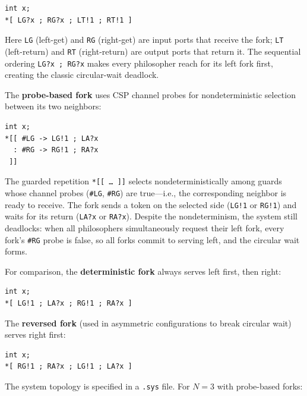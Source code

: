 \documentclass[11pt]{article}
\begin{document}
\begin{lstlisting}[frame=single,xleftmargin=1em,xrightmargin=1em]
int x;
*[ LG?x ; RG?x ; LT!1 ; RT!1 ]
\end{lstlisting}

Here \texttt{LG} (left-get) and \texttt{RG} (right-get) are input
ports that receive the fork; \texttt{LT} (left-return) and \texttt{RT}
(right-return) are output ports that return it.  The sequential
ordering \texttt{LG?x\,;\,RG?x} makes every philosopher reach for its
left fork first, creating the classic circular-wait deadlock.

The \textbf{probe-based fork} uses CSP channel probes for
nondeterministic selection between its two neighbors:

\begin{lstlisting}[frame=single,xleftmargin=1em,xrightmargin=1em]
int x;
*[[ #LG -> LG!1 ; LA?x
  : #RG -> RG!1 ; RA?x
 ]]
\end{lstlisting}

The guarded repetition \texttt{*[[\,\ldots\,]]} selects nondeterministically
among guards whose channel probes (\texttt{\#LG}, \texttt{\#RG}) are
true---i.e., the corresponding neighbor is ready to receive.  The fork
sends a token on the selected side (\texttt{LG!1} or \texttt{RG!1})
and waits for its return (\texttt{LA?x} or \texttt{RA?x}).  Despite
the nondeterminism, the system still deadlocks: when all philosophers
simultaneously request their left fork, every fork's \texttt{\#RG}
probe is false, so all forks commit to serving left, and the circular
wait forms.

For comparison, the \textbf{deterministic fork} always serves left
first, then right:

\begin{lstlisting}[frame=single,xleftmargin=1em,xrightmargin=1em]
int x;
*[ LG!1 ; LA?x ; RG!1 ; RA?x ]
\end{lstlisting}

The \textbf{reversed fork} (used in asymmetric configurations to break
circular wait) serves right first:

\begin{lstlisting}[frame=single,xleftmargin=1em,xrightmargin=1em]
int x;
*[ RG!1 ; RA?x ; LG!1 ; LA?x ]
\end{lstlisting}

The system topology is specified in a \texttt{.sys} file.  For $N=3$
with probe-based forks:
\end{document}
